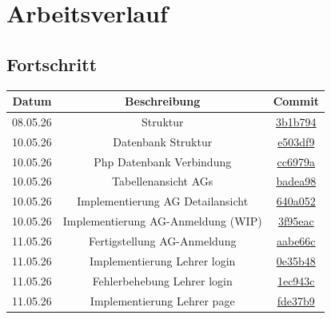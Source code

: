 \section{Arbeitsverlauf}
\subsection{Fortschritt}
\begin{center}
	\begin{tabular}{| c | c | c |}
		\hline
		Datum & Beschreibung & Commit \\[0.5ex]
		\hline\hline
		08.05.26 & Struktur & \href{https://github.com/Sobottasgithub/AG-Verwaltung/commit/3b1b79431383aaa8fc44d26e7c5d5f775c6134ef}{3b1b794} \\
		\hline
		10.05.26 & Datenbank Struktur & \href{https://github.com/Sobottasgithub/AG-Verwaltung/commit/e503df9fb1d338a2153f6687b1ff14974968ae62}{e503df9}\\
		\hline
		10.05.26 & Php Datenbank Verbindung & \href{https://github.com/Sobottasgithub/AG-Verwaltung/commit/cc6979af7afec12bd26646e1abb07ae257612c20}{cc6979a}\\
		\hline
		10.05.26 & Tabellenansicht AGs & \href{https://github.com/Sobottasgithub/AG-Verwaltung/commit/badea9876aaae1a52269bccef2668b521abd8216}{badea98}\\
		\hline
		10.05.26 & Implementierung AG Detailansicht & \href{https://github.com/Sobottasgithub/AG-Verwaltung/commit/640a052bcbe5efb9ca30396fae9ce33065652572}{640a052}\\
		\hline
		10.05.26 & Implementierung AG-Anmeldung (WIP) & \href{https://github.com/Sobottasgithub/AG-Verwaltung/commit/3f95eac45c0d61c61f8295cf10b81dbe3cc8dfb3}{3f95eac}\\
		\hline
		11.05.26 & Fertigstellung AG-Anmeldung & \href{https://github.com/Sobottasgithub/AG-Verwaltung/commit/aabe66c1067990f87263ee1bac320dd3e25ad659}{aabe66c}\\
		\hline
		11.05.26 & Implementierung Lehrer login& \href{https://github.com/Sobottasgithub/AG-Verwaltung/commit/0e35b4832f47a47361d465488ad1f1cd97982e63}{0e35b48}\\		
		\hline
		11.05.26 & Fehlerbehebung Lehrer login& \href{https://github.com/Sobottasgithub/AG-Verwaltung/commit/1ec943c548aaddcb74df69f87562476bbb05278c}{1ec943c}\\		
		\hline
		11.05.26 & Implementierung Lehrer page& \href{https://github.com/Sobottasgithub/AG-Verwaltung/commit/fde37b9ae7aece5630b16bc6c10176b8c9c3683d}{fde37b9}\\		

\end{tabular}
\end{center}
